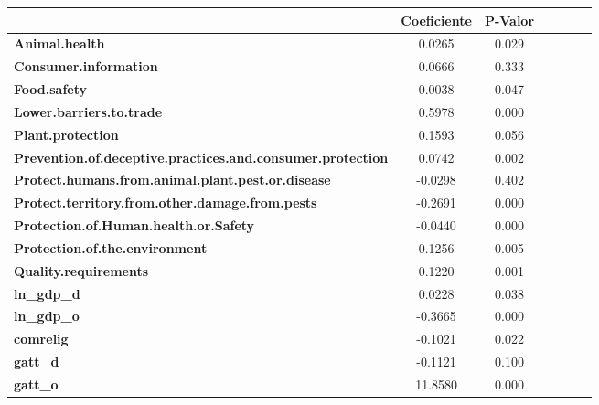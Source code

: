 \begin{table}[ht]
\begin{center}
\begin{tabular}{lcccccc}
                                                                   & \textbf{Coeficiente} & \textbf{P-Valor}\\
\midrule
\textbf{Animal.health}                                             &       0.0265  &         0.029       \\
\textbf{Consumer.information}                                      &       0.0666  &         0.333       \\
\textbf{Food.safety}                                               &       0.0038  &         0.047       \\
\textbf{Lower.barriers.to.trade}                                   &       0.5978  &         0.000       \\
\textbf{Plant.protection}                                          &       0.1593  &         0.056       \\
\textbf{Prevention.of.deceptive.practices.and.consumer.protection} &       0.0742  &         0.002       \\
\textbf{Protect.humans.from.animal.plant.pest.or.disease}          &      -0.0298  &         0.402       \\
\textbf{Protect.territory.from.other.damage.from.pests}            &      -0.2691  &         0.000       \\
\textbf{Protection.of.Human.health.or.Safety}                      &      -0.0440  &         0.000       \\
\textbf{Protection.of.the.environment}                             &       0.1256  &         0.005       \\
\textbf{Quality.requirements}                                      &       0.1220  &         0.001       \\
\textbf{ln\_gdp\_d}                                                &       0.0228  &         0.038       \\
\textbf{ln\_gdp\_o}                                                &      -0.3665  &         0.000       \\
\textbf{comrelig}                                                  &      -0.1021  &         0.022       \\
\textbf{gatt\_d}                                                   &      -0.1121  &         0.100       \\
\textbf{gatt\_o}                                                   &      11.8580  &         0.000       \\

\end{tabular}
\end{center}
\end{table}
